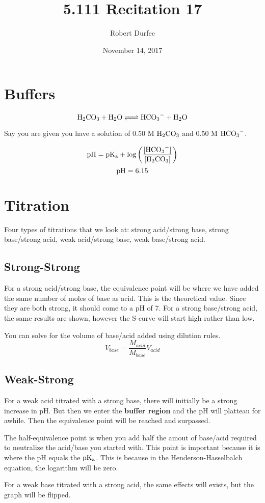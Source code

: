 \documentclass{article}
\title{ 5.111 Recitation 17 }
\author{ Robert Durfee }
\date{ November 14, 2017 }
\begin{document}
\maketitle

\section{ Buffers }

$$\ce{H_2CO_3 + H_2O <=> HCO_3- + H_2O}$$

Say you are given you have a solution of 0.50 M $\ce{H_2CO_3}$ and 0.50 M
$\ce{HCO_3-}$.

$$\rm{pH} = \rm{pK_a} + \log \left( \frac{[\ce{HCO_3-}]}{[\ce{H_2CO_3}]}
\right)$$
$$\rm{pH} = 6.15$$

\section{Titration}

Four types of titrations that we look at: strong acid/strong base, strong
base/strong acid, weak acid/strong base, weak base/strong acid.

\subsection{Strong-Strong}

For a strong acid/strong base, the equivalence point will be where we have added
the same number of moles of base as acid. This is the theoretical value. Since
they are both strong, it should come to a pH of 7. For a strong base/strong
acid, the same results are shown, however the S-curve will start high rather
than low.

You can solve for the volume of base/acid added using dilution rules. 
$$V_{base} = \frac{M_{acid}}{M_{base}} V_{acid}$$

\subsection{Weak-Strong}

For a weak acid titrated with a strong base, there will initially be a strong
increase in pH. But then we enter the \textbf{buffer region} and the pH will
platteau for awhile. Then the equivalence point will be reached and surpassed.

The half-equivalence point is when you add half the amout of base/acid required
to neutralize the acid/base you started with. This point is important because it
is where the pH equals the $\rm{pK_a}$. This is because in the
Henderson-Hasselbalch equation, the logarithm will be zero.

For a weak base titrated with a strong acid, the same effects will exists, but
the graph will be flipped.
\end{document}
